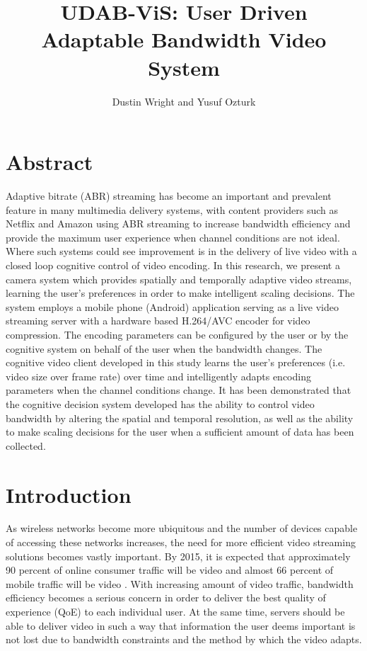 \documentclass[a4paper,12pt]{article}
\begin{document}
\title{UDAB-ViS: User Driven Adaptable Bandwidth Video System}
\author{Dustin Wright and Yusuf Ozturk}
\maketitle


\section*{Abstract}
Adaptive bitrate (ABR) streaming has become an important and prevalent feature in many multimedia delivery systems, with content providers such as Netflix and Amazon using ABR streaming to increase bandwidth efficiency and provide the maximum user experience when channel conditions are not ideal. Where such systems could see improvement is in the delivery of live video with a closed loop cognitive control of video encoding. In this research, we present a camera system which provides spatially and temporally adaptive video streams, learning the user’s preferences in order to make intelligent scaling decisions. The system employs a mobile phone (Android) application serving as a live video streaming server with a hardware based H.264/AVC encoder for video compression. The encoding parameters can be configured by the user or by the cognitive system on behalf of the user when the bandwidth changes. The cognitive video client  developed in this study learns the user’s preferences (i.e. video size over frame rate) over time and intelligently adapts  encoding parameters when the channel conditions change. It has been demonstrated that the cognitive decision system developed has  the ability to control video bandwidth by altering the spatial and temporal resolution, as well as the ability to make scaling decisions for the user when a sufficient amount of data has been collected.


\section{Introduction}
\label{sec:Intro}

As wireless networks become more ubiquitous and the number of devices capable of accessing these networks increases, the need for more efficient video streaming solutions becomes vastly important. By 2015, it is expected that approximately 90 percent of online consumer traffic will be video and almost 66 percent of mobile traffic will be video \cite{HASQoE}. With increasing amount of video traffic, bandwidth efficiency becomes a serious concern in order to deliver the best quality of experience (QoE) to each individual user. At the same time, servers should be able to deliver video in such a way that information the user deems important is not lost due to bandwidth constraints and the method by which the video adapts.
\end{document}
